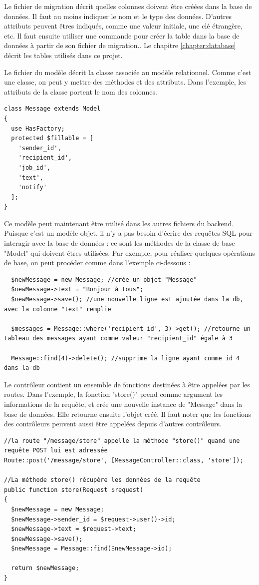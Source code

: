 \documentclass[
    iai, %
    eai, %
]{heig-tb}
\begin{document}
Le fichier de migration décrit quelles colonnes doivent être créées dans la base de données. Il faut au moins indiquer le nom et le type des données. D'autres attributs peuvent êtres indiqués, comme une valeur initiale, une clé étrangère, etc. Il faut ensuite utiliser une commande pour créer la table dans la base de données à partir de son fichier de migration..
Le chapitre \ref{chapter:database} décrit les tables utilisés dans ce projet.

\newpage
Le fichier du modèle décrit la classe associée au modèle relationnel. Comme c'est une classe, on peut y mettre des méthodes et des attributs. Dans l'exemple, les attributs de la classe portent le nom des colonnes.

\begin{verbatim}
class Message extends Model
{
  use HasFactory;
  protected $fillable = [
    'sender_id',
    'recipient_id',
    'job_id',
    'text',
    'notify'
  ];
}
\end{verbatim}

Ce modèle peut maintenant être utilisé dans les autres fichiers du backend. Puisque c'est un modèle objet, il n'y a pas besoin d'écrire des requêtes SQL pour interagir avec la base de données : ce sont les méthodes de la classe de base "Model" qui doivent êtres utilisées. Par exemple, pour réaliser quelques opérations de base, on peut procéder comme dans l'exemple ci-dessous :

\begin{verbatim}
  $newMessage = new Message; //crée un objet "Message"
  $newMessage->text = "Bonjour à tous";
  $newMessage->save(); //une nouvelle ligne est ajoutée dans la db, avec la colonne "text" remplie

  $messages = Message::where('recipient_id', 3)->get(); //retourne un tableau des messages ayant comme valeur "recipient_id" égale à 3

  Message::find(4)->delete(); //supprime la ligne ayant comme id 4 dans la db
\end{verbatim}

Le contrôleur contient un ensemble de fonctions destinées à être appelées par les routes. Dans l'exemple, la fonction "store()" prend comme argument les informations de la requête, et crée une nouvelle instance de "Message" dans la base de données. Elle retourne ensuite l'objet créé. Il faut noter que les fonctions des contrôleurs peuvent aussi être appelées depuis d'autres contrôleurs.

\begin{verbatim}
//la route "/message/store" appelle la méthode "store()" quand une requête POST lui est adressée
Route::post('/message/store', [MessageController::class, 'store']);

//La méthode store() récupère les données de la requête
public function store(Request $request)
{
  $newMessage = new Message;
  $newMessage->sender_id = $request->user()->id;
  $newMessage->text = $request->text;
  $newMessage->save();
  $newMessage = Message::find($newMessage->id);

  return $newMessage;
}
\end{verbatim}
\end{document}
